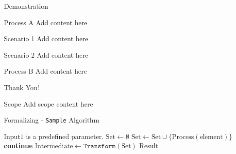 \documentclass{beamer}
\begin{document}
\begin{frame}{Demonstration}
    \begin{block}{Process A}
        Add content here
    \end{block}
    \begin{block}{Scenario 1}
        Add content here
    \end{block}
    \begin{alertblock}{Scenario 2}
        Add content here
    \end{alertblock}
    \begin{block}{Process B}
        Add content here
    \end{block}
    \note{}
\end{frame}
                                             			
\begin{frame}
    \centering
    \Huge Thank You!
    \note{}
\end{frame}
                    
\appendix
                    
\begin{frame}[label=scope]{Scope \hyperlink{objectives}{}}
    Add scope content here
    \note{}
\end{frame}

\begin{frame}[label=algo1]{Formalizing - \texttt{Sample} Algorithm \hyperlink{process1}{}}
    \begin{algorithm}[H]
        \small
        \caption{$(\text{Result}) \gets \texttt{Sample}(\text{Input1})$}
        \label{alg:algo1}
        \begin{algorithmic}[1]
            \Require $\text{Input1}$ is a predefined parameter.
            \State $\text{Set} \gets \emptyset$
            \State $\text{Set} \gets \text{Set} \cup \{\text{Process}(\text{element})\}$
            \Else
            \State \textbf{continue}
            \EndIf
            \EndFor
            \State $\text{Intermediate} \gets \texttt{Transform}(\text{Set})$
            \State \Return $\text{Result}$
        \end{algorithmic}
    \end{algorithm}
    \note{}
\end{frame}
    
\end{document}
